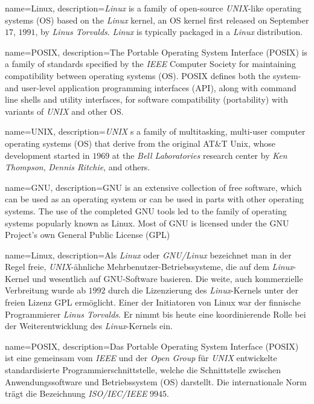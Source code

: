	{%
		name={Linux},
		description={\textit{Linux} is a family of open-source \textit{UNIX}-like operating systems (OS) based on the \textit{Linux} kernel, an OS kernel first released on September $17$, $1991$, by \textit{Linus Torvalds}. \textit{Linux} is typically packaged in a \textit{Linux} distribution.}
	}

	{%
		name={POSIX},
		description={The Portable Operating System Interface (POSIX) is a family of standards specified by the \textit{IEEE} Computer Society for maintaining compatibility between operating systems (OS). POSIX defines both the system- and user-level application programming interfaces (API), along with command line shells and utility interfaces, for software compatibility (portability) with variants of \textit{UNIX} and other OS.}
	}

	{%
		name={UNIX},
		description={\textit{UNIX} s a family of multitasking, multi-user computer operating systems (OS) that derive from the original AT\&T Unix, whose development started in $1969$ at the \textit{Bell Laboratories} research center by \textit{Ken Thompson}, \textit{Dennis Ritchie}, and others.}
	}

\else

	{%
		name={GNU},
		description={GNU is an extensive collection of free software, which can be used as an operating system or can be used in parts with other operating systems. The use of the completed GNU tools led to the family of operating systems popularly known as Linux. Most of GNU is licensed under the GNU Project's own General Public License (GPL)}
	}

	{%
		name={Linux},
		description={Als \textit{Linux} oder \textit{GNU/Linux} bezeichnet man in der Regel freie, \textit{UNIX}-ähnliche Mehrbenutzer-Betriebssysteme, die auf dem \textit{Linux}-Kernel und wesentlich auf GNU-Software basieren. Die weite, auch kommerzielle Verbreitung wurde ab $1992$ durch die Lizenzierung des \textit{Linux}-Kernels unter der freien Lizenz GPL ermöglicht. Einer der Initiatoren von Linux war der finnische Programmierer \textit{Linus Torvalds}. Er nimmt bis heute eine koordinierende Rolle bei der Weiterentwicklung des \textit{Linux}-Kernels ein.}
	}

	{%
		name={POSIX},
		description={Das Portable Operating System Interface (POSIX) ist eine gemeinsam vom \textit{IEEE} und der \textit{Open Group} für \textit{UNIX} entwickelte standardisierte Programmierschnittstelle, welche die Schnittstelle zwischen Anwendungssoftware und Betriebssystem (OS) darstellt. Die internationale Norm trägt die Bezeichnung \textit{ISO/IEC/IEEE} $9945$.}
	}

